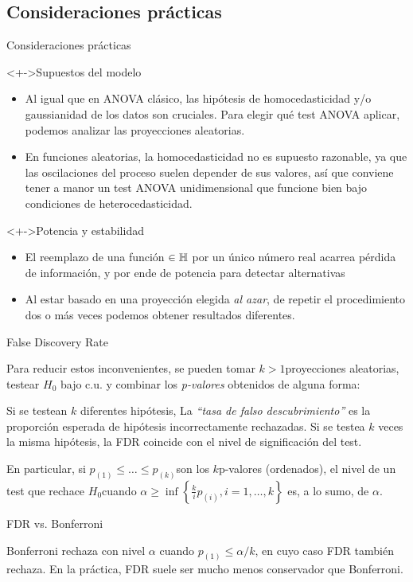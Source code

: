 \documentclass[10pt,spanish,handout]{beamer}\usepackage[]{graphicx}\usepackage[]{color}
\begin{document}
\subsection{Consideraciones prácticas}
\begin{frame}{Consideraciones prácticas}
\begin{alertblock}<+->{Supuestos del modelo}
\begin{itemize}[<+->]
\item Al igual que en ANOVA clásico, las hipótesis de homocedasticidad
y/o gaussianidad de los datos son cruciales. Para elegir qué test
ANOVA aplicar, podemos analizar las proyecciones aleatorias. 
\item En funciones aleatorias, la homocedasticidad no es supuesto razonable,
ya que las oscilaciones del proceso suelen depender de sus valores,
así que conviene tener a manor un test ANOVA unidimensional que funcione
bien bajo condiciones de heterocedasticidad.
\end{itemize}
\end{alertblock}

\pause{}
\begin{alertblock}<+->{Potencia y estabilidad}
\begin{itemize}[<+->]
\item El reemplazo de una función $\in\mathbb{H}$ por un único número real acarrea
pérdida de información, y por ende de potencia para detectar alternativas
\item Al estar basado en una proyección elegida \emph{al azar}, de repetir
el procedimiento dos o más veces podemos obtener resultados diferentes.
\end{itemize}
\end{alertblock}
\end{frame}
%
\begin{frame}{False Discovery Rate}

Para reducir estos inconvenientes, se pueden tomar $k>1$proyecciones
aleatorias, testear $H_{0}$ bajo c.u. y combinar los \emph{p-valores}
obtenidos de alguna forma:  

\pause{}

Si se testean $k$ diferentes hipótesis, La \emph{“tasa de falso
descubrimiento”} es la proporción esperada de hipótesis incorrectamente
rechazadas. Si se testea $k$ veces la misma hipótesis, la FDR coincide
con el nivel de significación del test. 

\pause{}

En particular, si $p_{\left(1\right)}\leq\dots\leq p_{\left(k\right)}$son
los $k$p-valores (ordenados), el nivel de un test que rechace $H_{0}$cuando
$\alpha\geq\inf\left\{ \frac{k}{i}p_{\left(i\right)},i=1,\dots,k\right\} $
es, a lo sumo, de $\alpha$.

\pause{}
\begin{alertblock}{FDR vs. Bonferroni}

Bonferroni rechaza con nivel $\alpha$ cuando $p_{\left(1\right)}\leq$$\alpha/k$,
en cuyo caso FDR también rechaza. En la práctica, FDR suele ser mucho
menos conservador que Bonferroni.
\end{alertblock}
\end{frame}
\end{document}
